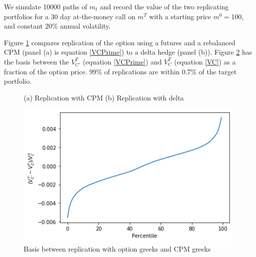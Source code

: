 \documentclass[12pt]{article}
\begin{document}
We simulate 10000 paths of $m_t$ and record the value of the two replicating portfolios for a 30 day at-the-money call on $m^T$ with a starting price $m^0=100$, and constant $20\%$ annual volatility.

Figure \ref{fig:ReplicationComparison} compares replication of the option using a futures and a rebalanced CPM (panel (a) is equation \ref{VCPrime}) to a delta hedge (panel (b)). Figure \ref{fig:CPMBasisPercentile} has the basis between the $V_{C'}^T$ (equation \ref{VCPrime}) and $V_C^T$ (equation \ref{VC}) as a fraction of the option price. 99\% of replications are within 0.7\% of the target portfolio.




\begin{figure}
    \centering
    \caption{(a) Replication with CPM (b) Replication with delta }
    \label{fig:ReplicationComparison}
\end{figure}


\begin{figure}[t] 
\includegraphics[width=12cm]{figs/CPMBasisPercentile.png}
\centering
\caption{Basis between replication with option greeks and CPM greeks}
\label{fig:CPMBasisPercentile}
\end{figure}
\end{document}
